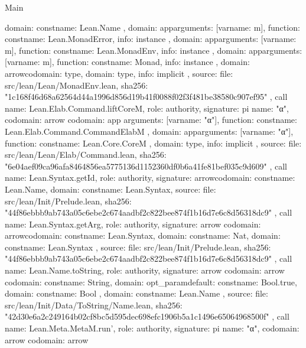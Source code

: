 \begin{lexlean}{Main}
\begin{toolingmodule}
{{{{{{{                domain: const{name: Lean.Name}
              },
              domain: app{arguments: [var{name: m}], function: const{name: Lean.MonadError}},
              info: instance
            },
            domain: app{arguments: [var{name: m}], function: const{name: Lean.MonadEnv}},
            info: instance
          },
          domain: app{arguments: [var{name: m}], function: const{name: Monad}},
          info: instance
        },
        domain: arrow{codomain: type{}, domain: type{}},
        info: implicit
      },
      source: {
        file: src/lean/Lean/MonadEnv.lean,
        sha256: "1c168f46d68a62564d44a1996d856d19b41f0088f02f3f481be38580c907ef95"
      }
    },
    call{
      name: Lean.Elab.Command.liftCoreM,
      role: authority,
      signature: pi{
        name: "α",
        codomain: arrow{
          codomain: app{
            arguments: [var{name: "α"}],
            function: const{name: Lean.Elab.Command.CommandElabM}
          },
          domain: app{arguments: [var{name: "α"}], function: const{name: Lean.Core.CoreM}}
        },
        domain: type{},
        info: implicit
      },
      source: {
        file: src/lean/Lean/Elab/Command.lean,
        sha256: "6e04aef09ca96afa8464856ea5775136d1152360df0b6a41fe81bef035c9d609"
      }
    },
    call{
      name: Lean.Syntax.getId,
      role: authority,
      signature: arrow{codomain: const{name: Lean.Name}, domain: const{name: Lean.Syntax}},
      source: {
        file: src/lean/Init/Prelude.lean,
        sha256: "44f86ebbb9ab743a05c6ebe2c674aadbf2c822bee874f1b16d7e6c8d56318dc9"
      }
    },
    call{
      name: Lean.Syntax.getArg,
      role: authority,
      signature: arrow{
        codomain: arrow{codomain: const{name: Lean.Syntax}, domain: const{name: Nat}},
        domain: const{name: Lean.Syntax}
      },
      source: {
        file: src/lean/Init/Prelude.lean,
        sha256: "44f86ebbb9ab743a05c6ebe2c674aadbf2c822bee874f1b16d7e6c8d56318dc9"
      }
    },
    call{
      name: Lean.Name.toString,
      role: authority,
      signature: arrow{
        codomain: arrow{
          codomain: const{name: String},
          domain: opt_param{default: const{name: Bool.true}, domain: const{name: Bool}}
        },
        domain: const{name: Lean.Name}
      },
      source: {
        file: src/lean/Init/Data/ToString/Name.lean,
        sha256: "42d30e6a2c249164b02cf8bc5d595dec698efc1906b5a1c1496e65064968500f"
      }
    },
    call{
      name: Lean.Meta.MetaM.run',
      role: authority,
      signature: pi{
        name: "α",
        codomain: arrow{
          codomain: arrow{
}}}}}
\end{toolingmodule}
\end{lexlean}
